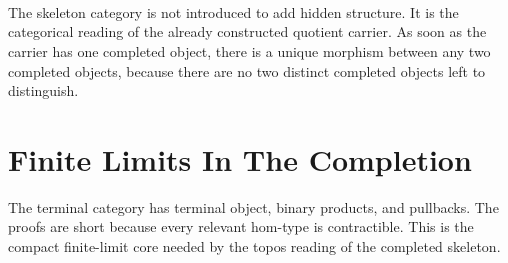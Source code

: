 \documentclass[11pt]{article}
\begin{document}
\begin{code}
\AgdaSymbol{:}\AgdaSpace{}%
\AgdaSpace{}%
\AgdaSpace{}%
\AgdaSpace{}%
\<%
\\
\>[0]\AgdaSpace{}%
\AgdaSymbol{=}\AgdaSpace{}%
\AgdaSpace{}%
\<%
\\
%
\\[\AgdaEmptyExtraSkip]%
\>[0]\<%
\\
\>[0]\AgdaSpace{}%
\AgdaSymbol{:}\<%
\\
\>[0][@{}l@{\AgdaIndent{0}}]%
\>[2]\AgdaSymbol{(}\AgdaSpace{}%
\AgdaSymbol{:}\AgdaSpace{}%
\AgdaSymbol{)}\AgdaSpace{}%
\<%
\\
%
\>[2]\AgdaSpace{}%
\AgdaSpace{}%
\AgdaSpace{}%
\AgdaSpace{}%
\<%
\\
\>[0]\AgdaSpace{}%
\AgdaSymbol{=}\<%
\\
\>[0][@{}l@{\AgdaIndent{0}}]%
\>[2]\AgdaSpace{}%
\<%
\end{code}

The skeleton category is not introduced to add hidden structure.  It is
the categorical reading of the already constructed quotient carrier.  As
soon as the carrier has one completed object, there is a unique morphism
between any two completed objects, because there are no two distinct
completed objects left to distinguish.

\section{Finite Limits In The Completion}

The terminal category has terminal object, binary products, and
pullbacks.  The proofs are short because every relevant hom-type is
contractible.  This is the compact finite-limit core needed by the
topos reading of the completed skeleton.
\end{document}
